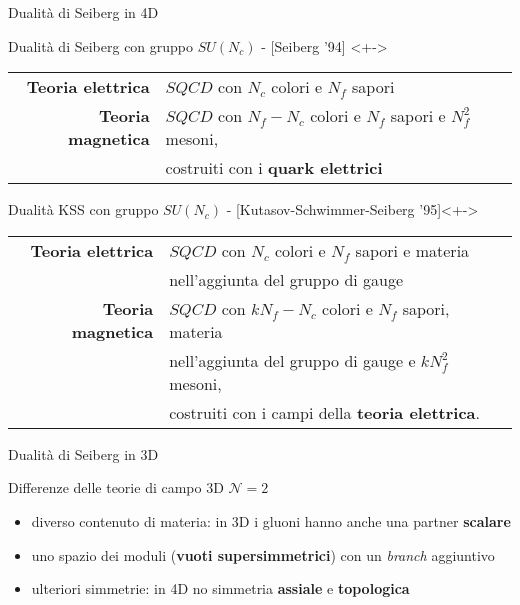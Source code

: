 \documentclass[10pt,compress,usenames,dvipsnames]{beamer}
\begin{document}
\begin{frame}{Dualità di Seiberg in 4D}

\begin{block}{Dualità di Seiberg con gruppo $SU(N_c)$ - [Seiberg '94] }<+->
\begin{tabular}{r l}
{\bfseries  Teoria elettrica} &   $SQCD$ con $N_c$ colori e $N_f$ sapori \\[0.1cm]
{\bfseries   Teoria magnetica} &   $SQCD$ con $N_f - N_c$ colori e $N_f$ sapori e 
 $N_f^2$  mesoni,  \\ 
 & costruiti con i \alert{\bfseries quark elettrici}\\
\end{tabular}
\end{block}

\vspace{0.5cm}


\begin{block}{Dualità KSS con gruppo $SU(N_c)$ - [Kutasov-Schwimmer-Seiberg '95]}<+->
\begin{tabular}{r l}
{\bfseries  Teoria elettrica}  &  $SQCD$ con $N_c$ colori e $N_f$ sapori e  materia \\ &  nell'aggiunta del gruppo di gauge  \\[0.1cm]
{\bfseries  Teoria magnetica}  &  $SQCD$ con $k N_f - N_c$ colori e $N_f$ sapori, materia \\  & nell'aggiunta del gruppo di gauge  e  $k N_f^2$ mesoni, \\
&  costruiti con i campi della \alert{\bfseries teoria elettrica}.
\end{tabular}
\end{block}
\vfill 
\end{frame}



\begin{frame}{Dualità di Seiberg in 3D}
\begin{block}{Differenze delle teorie di campo 3D $\mathcal{N}=2$}
\begin{itemize}
\item diverso contenuto di materia: in 3D i gluoni hanno anche una partner \alert{\bfseries scalare} 
\item uno spazio dei moduli (\alert{\bfseries vuoti supersimmetrici}) con un \emph{branch} aggiuntivo  
\item ulteriori simmetrie: in 4D no simmetria \alert{\bfseries assiale} e \alert{\bfseries topologica} 
\end{itemize}
\end{block}

\end{frame}
\end{document}
